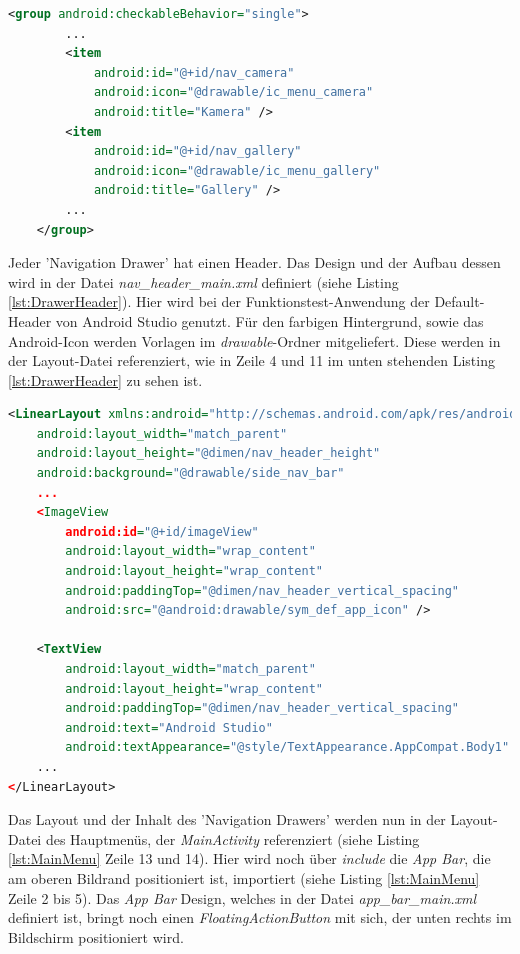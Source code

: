 \begin{lstlisting}[caption=Definition der Menüpunkte im 'Navigation Drawer' der Hauptseite in der Datei \textit{activity\_main\_drawer.xml}, label=lst:DrawerMenu, language=XML]
<group android:checkableBehavior="single">      
		...              
        <item
            android:id="@+id/nav_camera"
            android:icon="@drawable/ic_menu_camera"
            android:title="Kamera" />
        <item
            android:id="@+id/nav_gallery"
            android:icon="@drawable/ic_menu_gallery"
            android:title="Gallery" />       
		...               
    </group>
\end{lstlisting} 

Jeder 'Navigation Drawer' hat einen Header. Das Design und der Aufbau dessen wird in der Datei \textit{nav\_header\_main.xml} definiert (siehe Listing \ref{lst:DrawerHeader}). Hier wird bei der Funktionstest-Anwendung der Default-Header von Android Studio genutzt. Für den farbigen Hintergrund, sowie das Android-Icon werden Vorlagen im \textit{drawable}-Ordner mitgeliefert. Diese werden in der Layout-Datei referenziert, wie in Zeile 4 und 11 im unten stehenden Listing \ref{lst:DrawerHeader} zu sehen ist.
\clearpage

\begin{lstlisting}[caption=Definition des Headers des 'Navigation Drawers' in der Datei \textit{nav\_header\_main.xml}, label=lst:DrawerHeader, language=XML]
<LinearLayout xmlns:android="http://schemas.android.com/apk/res/android"
    android:layout_width="match_parent"
    android:layout_height="@dimen/nav_header_height"
    android:background="@drawable/side_nav_bar"    
    ...
    <ImageView
        android:id="@+id/imageView"
        android:layout_width="wrap_content"
        android:layout_height="wrap_content"
        android:paddingTop="@dimen/nav_header_vertical_spacing"
        android:src="@android:drawable/sym_def_app_icon" />

    <TextView
        android:layout_width="match_parent"
        android:layout_height="wrap_content"
        android:paddingTop="@dimen/nav_header_vertical_spacing"
        android:text="Android Studio"
        android:textAppearance="@style/TextAppearance.AppCompat.Body1" />
    ...
</LinearLayout>
\end{lstlisting} 

Das Layout und der Inhalt des 'Navigation Drawers' werden nun in der Layout-Datei des Hauptmenüs, der \textit{MainActivity} referenziert (siehe Listing \ref{lst:MainMenu} Zeile 13 und 14). Hier wird noch über \textit{include} die \textit{App Bar}, die am oberen Bildrand positioniert ist, importiert (siehe Listing \ref{lst:MainMenu} Zeile 2 bis 5). Das \textit{App Bar} Design, welches in der Datei \textit{app\_bar\_main.xml} definiert ist, bringt noch einen \textit{FloatingActionButton} mit sich, der unten rechts im Bildschirm positioniert wird. 

